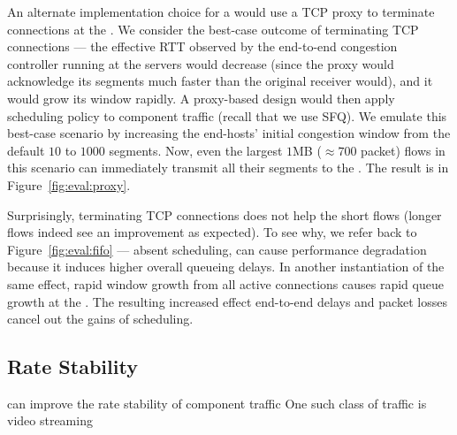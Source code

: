 

 An alternate implementation choice for a \name would use a TCP proxy to terminate connections at the \inbox. 
We consider the best-case outcome of terminating TCP connections --- the effective RTT observed by the end-to-end congestion controller running at the servers would decrease (since the proxy would acknowledge its segments much faster than the original receiver would), and it would grow its window rapidly.
A proxy-based design would then apply scheduling policy to component traffic (recall that we use SFQ).
We emulate this best-case scenario by increasing the end-hosts' initial congestion window from the default $10$ to $1000$ segments.
Now, even the largest $1$MB ($\approx700$ packet) flows in this scenario can immediately transmit all their segments to the \inbox.
The result is in Figure~\ref{fig:eval:proxy}.



Surprisingly, terminating TCP connections does not help the short flows (longer flows indeed see an improvement as expected). 
To see why, we refer back to Figure~\ref{fig:eval:fifo} --- absent scheduling, \name can cause performance degradation because it induces higher overall queueing delays.
In another instantiation of the same effect, rapid window growth from all active connections causes rapid queue growth at the \inbox. The resulting increased effect end-to-end delays and packet losses cancel out the gains of scheduling. 

\subsection{Rate Stability}\label{s:eval:ratestable}

\begin{outline}
    \1 \name can improve the rate stability of component traffic
    \1 One such class of traffic is video streaming
\end{outline}

